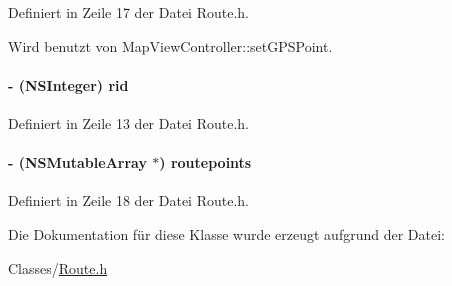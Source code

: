 Definiert in Zeile 17 der Datei Route.h.

Wird benutzt von MapViewController::setGPSPoint.\hypertarget{interface_route_a0d881da071b4c7b17ef600672bd25698}{
\paragraph[{rid}]{\setlength{\rightskip}{0pt plus 5cm}-\/ (NSInteger) rid}\hfill}
\label{interface_route_a0d881da071b4c7b17ef600672bd25698}


Definiert in Zeile 13 der Datei Route.h.\hypertarget{interface_route_ac914a04bbdf46f1d6dcf3359d4f8d98a}{
\paragraph[{routepoints}]{\setlength{\rightskip}{0pt plus 5cm}-\/ (NSMutableArray $\ast$) routepoints}\hfill}
\label{interface_route_ac914a04bbdf46f1d6dcf3359d4f8d98a}


Definiert in Zeile 18 der Datei Route.h.

Die Dokumentation für diese Klasse wurde erzeugt aufgrund der Datei:\begin{DoxyCompactItemize}
\item 
Classes/\hyperlink{_route_8h}{Route.h}\end{DoxyCompactItemize}
